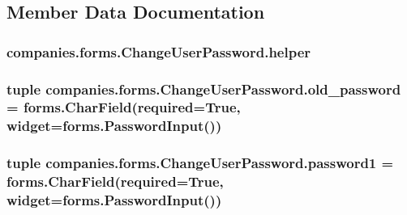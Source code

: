 \subsection{Member Data Documentation}
\hypertarget{classcompanies_1_1forms_1_1_change_user_password_a140e79dc3ff62bec229a256dfb968903}{
\subsubsection[{helper}]{\setlength{\rightskip}{0pt plus 5cm}companies.\-forms.\-Change\-User\-Password.\-helper}}\label{classcompanies_1_1forms_1_1_change_user_password_a140e79dc3ff62bec229a256dfb968903}
\hypertarget{classcompanies_1_1forms_1_1_change_user_password_a4362b9d1bb62772f1ad1db2798a419de}{
\subsubsection[{old\-\_\-password}]{\setlength{\rightskip}{0pt plus 5cm}tuple companies.\-forms.\-Change\-User\-Password.\-old\-\_\-password = forms.\-Char\-Field(required=True, {\bf widget}=forms.\-Password\-Input())\hspace{0.3cm}{\ttfamily [static]}}}\label{classcompanies_1_1forms_1_1_change_user_password_a4362b9d1bb62772f1ad1db2798a419de}
\hypertarget{classcompanies_1_1forms_1_1_change_user_password_a29b3dce883ddffc160a783e4a6d542ca}{
\subsubsection[{password1}]{\setlength{\rightskip}{0pt plus 5cm}tuple companies.\-forms.\-Change\-User\-Password.\-password1 = forms.\-Char\-Field(required=True, {\bf widget}=forms.\-Password\-Input())\hspace{0.3cm}{\ttfamily [static]}}}\label{classcompanies_1_1forms_1_1_change_user_password_a29b3dce883ddffc160a783e4a6d542ca}
